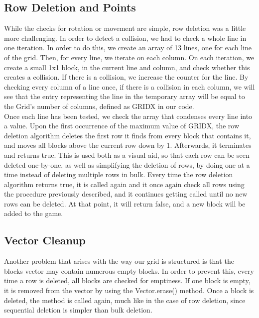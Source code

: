 	\subsection{Row Deletion and Points}
		While the checks for rotation or movement are simple, row deletion was a little more challenging. In order to detect a collision, we had to check a whole line in one iteration. In order to do this,
		we create an array of 13 lines, one for each line of the grid. Then, for every line, we iterate on each column. On each iteration, we create a small 1x1 block, in the current line and column, and
		check whether this creates a collision. If there is a collision, we increase the counter for the line. By checking every column of a line once, if there is a collision in each column, we will see
		that the entry representing the line in the temporary array will be equal to the Grid's number of columns, defined as GRIDX in our code. \\
		Once each line has been tested, we check the array that condenses every line into a value. Upon the first occurrence of the maximum value of GRIDX, the row deletion algorithm deletes the first row
		it finds from every block that contains it, and moves all blocks above the current row down by 1. Afterwards, it terminates and returns true. This is used both as a visual aid, so that each row can
		be seen deleted one-by-one, as well as simplifying the deletion of rows, by doing one at a time instead of deleting multiple rows in bulk. Every time the row deletion algorithm returns true, it is called
		again and it once again check all rows using the procedure previously described, and it continues getting called until no new rows can be deleted. At that point, it will return false, and a new block 
		will be added to the game.
	\subsection{Vector Cleanup}
		Another problem that arises with the way our grid is structured is that the blocks vector may contain numerous empty blocks. In order to prevent this, every time a row is deleted,
		all blocks are checked for emptiness. If one block is empty, it is removed from the vector by using the Vector.erase() method. Once a block is deleted, the method is called again, much like
		in the case of row deletion, since sequential deletion is simpler than bulk deletion.
